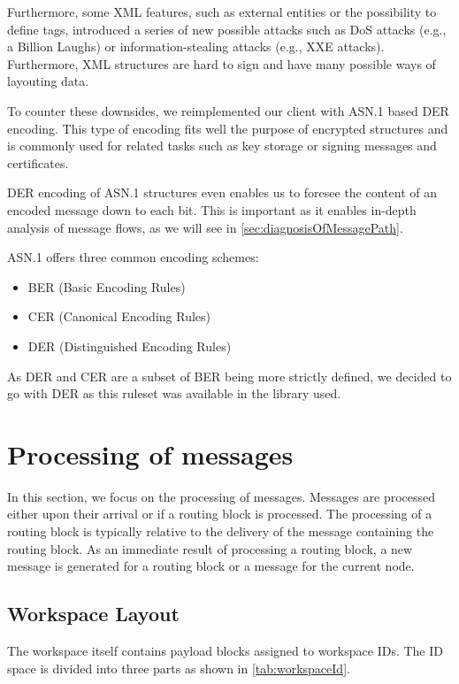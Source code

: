 Furthermore, some XML features, such as external entities or the possibility to define tags, introduced a series of new possible attacks such as DoS attacks (e.g., a Billion Laughs) or information-stealing attacks (e.g., XXE attacks). Furthermore, XML structures are hard to sign and have many possible ways of layouting data. 

To counter these downsides, we reimplemented our client with ASN.1 based DER encoding. This type of encoding fits well the purpose of encrypted structures and is commonly used for related tasks such as key storage or signing messages and certificates.

DER encoding of ASN.1 structures even enables us to foresee the content of an encoded message down to each bit. This is important as it enables in-depth analysis of message flows, as we will see in \cref{sec:diagnosisOfMessagePath}.

ASN.1 offers three common encoding schemes:
\begin{itemize}
	\item BER (Basic Encoding Rules)
	\item CER (Canonical Encoding Rules)
	\item DER (Distinguished Encoding Rules)
\end{itemize}

As DER and CER are a subset of BER being more strictly defined, we decided to go with DER as this ruleset was available in the library used.

\section{Processing of messages\label{sec:messageProcessing}}
In this section, we focus on the processing of messages. Messages are processed either upon their arrival or if a routing block is processed. The processing of a routing block is typically relative to the delivery of the message containing the routing block. As an immediate result of processing a routing block, a new message is generated for a routing block or a message for the current node.

\subsection{Workspace Layout}
The workspace itself contains payload blocks assigned to workspace IDs. The ID space is divided into three parts as shown in \cref{tab:workspaceId}.

